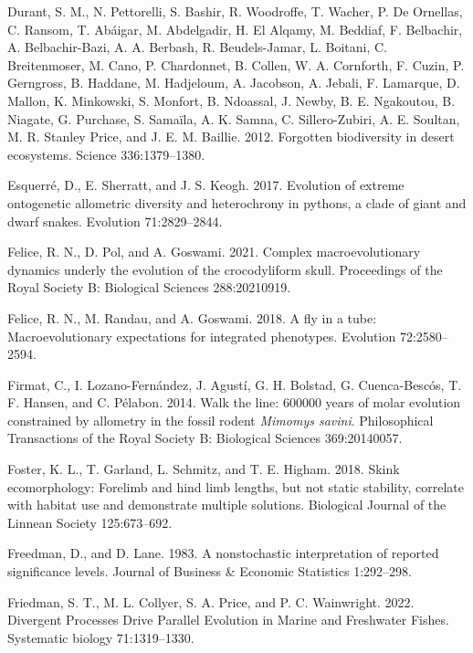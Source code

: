 \documentclass[
  11pt,
]{article}
\begin{document}
\leavevmode\hypertarget{ref-Durant2012}{}%
Durant, S. M., N. Pettorelli, S. Bashir, R. Woodroffe, T. Wacher, P. De
Ornellas, C. Ransom, T. Abáigar, M. Abdelgadir, H. El Alqamy, M.
Beddiaf, F. Belbachir, A. Belbachir-Bazi, A. A. Berbash, R.
Beudels-Jamar, L. Boitani, C. Breitenmoser, M. Cano, P. Chardonnet, B.
Collen, W. A. Cornforth, F. Cuzin, P. Gerngross, B. Haddane, M.
Hadjeloum, A. Jacobson, A. Jebali, F. Lamarque, D. Mallon, K. Minkowski,
S. Monfort, B. Ndoassal, J. Newby, B. E. Ngakoutou, B. Niagate, G.
Purchase, S. Samaïla, A. K. Samna, C. Sillero-Zubiri, A. E. Soultan, M.
R. Stanley Price, and J. E. M. Baillie. 2012. Forgotten biodiversity in
desert ecosystems. Science 336:1379--1380.

\leavevmode\hypertarget{ref-Esquerre2017}{}%
Esquerré, D., E. Sherratt, and J. S. Keogh. 2017. Evolution of extreme
ontogenetic allometric diversity and heterochrony in pythons, a clade of
giant and dwarf snakes. Evolution 71:2829--2844.

\leavevmode\hypertarget{ref-Felice2021}{}%
Felice, R. N., D. Pol, and A. Goswami. 2021. Complex macroevolutionary
dynamics underly the evolution of the crocodyliform skull. Proceedings
of the Royal Society B: Biological Sciences 288:20210919.

\leavevmode\hypertarget{ref-Felice2018}{}%
Felice, R. N., M. Randau, and A. Goswami. 2018. A fly in a tube:
Macroevolutionary expectations for integrated phenotypes. Evolution
72:2580--2594.

\leavevmode\hypertarget{ref-Firmat2014}{}%
Firmat, C., I. Lozano-Fernández, J. Agustí, G. H. Bolstad, G.
Cuenca-Bescós, T. F. Hansen, and C. Pélabon. 2014. Walk the line: 600000
years of molar evolution constrained by allometry in the fossil rodent
\emph{Mimomys savini}. Philosophical Transactions of the Royal Society
B: Biological Sciences 369:20140057.

\leavevmode\hypertarget{ref-Foster2018}{}%
Foster, K. L., T. Garland, L. Schmitz, and T. E. Higham. 2018. Skink
ecomorphology: Forelimb and hind limb lengths, but not static stability,
correlate with habitat use and demonstrate multiple solutions.
Biological Journal of the Linnean Society 125:673--692.

\leavevmode\hypertarget{ref-Freedman1983}{}%
Freedman, D., and D. Lane. 1983. A nonstochastic interpretation of
reported significance levels. Journal of Business \& Economic Statistics
1:292--298.

\leavevmode\hypertarget{ref-Friedman2022}{}%
Friedman, S. T., M. L. Collyer, S. A. Price, and P. C. Wainwright. 2022.
Divergent Processes Drive Parallel Evolution in Marine and Freshwater
Fishes. Systematic biology 71:1319--1330.
\end{document}
